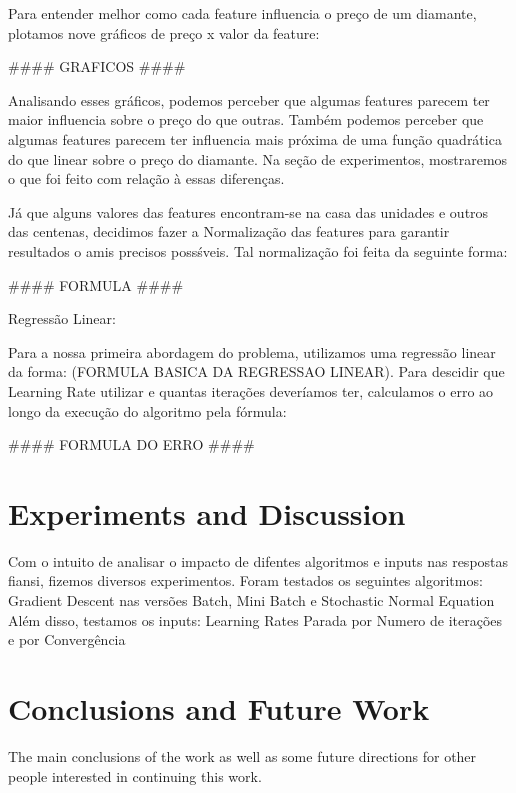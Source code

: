 \documentclass[conference]{IEEEtran}
\begin{document}
Para entender melhor como cada feature influencia o preço de um diamante, plotamos nove gráficos de preço x valor da feature:

#### GRAFICOS ####

Analisando esses gráficos, podemos perceber que algumas features parecem ter maior influencia sobre o preço do que outras. Também podemos perceber que algumas features parecem ter influencia mais próxima de uma função quadrática do que linear sobre o preço do diamante. Na seção de experimentos, mostraremos o que foi feito com relação à essas diferenças.

Já que alguns valores das features encontram-se na casa das unidades e outros das centenas, decidimos fazer a Normalização das features para garantir resultados o amis precisos possśveis. Tal normalização foi feita da seguinte forma:

#### FORMULA ####



Regressão Linear:

Para a nossa primeira abordagem do problema, utilizamos uma regressão linear da forma: (FORMULA BASICA DA REGRESSAO LINEAR).
Para descidir que Learning Rate utilizar e quantas iterações deveríamos ter, calculamos o erro ao longo da execução do algoritmo pela fórmula:

#### FORMULA DO ERRO ####



\section{Experiments and Discussion}

Com o intuito de analisar o impacto de difentes algoritmos e inputs nas respostas fiansi, fizemos diversos experimentos.
Foram testados os seguintes algoritmos:
Gradient Descent nas versões Batch, Mini Batch e Stochastic
Normal Equation
Além disso, testamos os inputs:
Learning Rates
Parada por Numero de iterações e por Convergência




\section{Conclusions and Future Work}

The main conclusions of the work as well as some future directions for other people interested in continuing this work.



\end{document}
